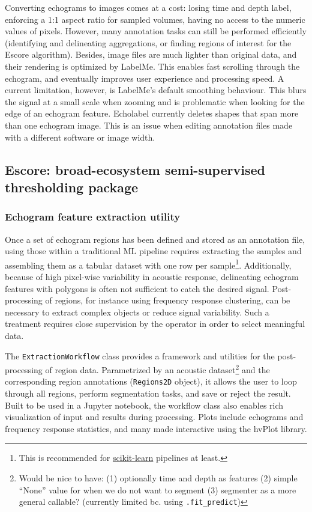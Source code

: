 \documentclass[
  10pt,
  letterpaper,
]{article}
\begin{document}
Converting echograms to images comes at a cost: losing time and depth
label, enforcing a 1:1 aspect ratio for sampled volumes, having no
access to the numeric values of pixels. However, many annotation tasks
can still be performed efficiently (identifying and delineating
aggregations, or finding regions of interest for the Escore algorithm).
Besides, image files are much lighter than original data, and their
rendering is optimized by LabelMe. This enables fast scrolling through
the echogram, and eventually improves user experience and processing
speed. A current limitation, however, is LabelMe's default smoothing
behaviour. This blurs the signal at a small scale when zooming and is
problematic when looking for the edge of an echogram feature. Echolabel
currently deletes shapes that span more than one echogram image. This is
an issue when editing annotation files made with a different software or
image width.

\subsection{Escore: broad-ecosystem semi-supervised thresholding
package}\label{escore-broad-ecosystem-semi-supervised-thresholding-package}

\subsubsection{Echogram feature extraction
utility}\label{echogram-feature-extraction-utility}

Once a set of echogram regions has been defined and stored as an
annotation file, using those within a traditional ML pipeline requires
extracting the samples and assembling them as a tabular dataset with one
row per sample\footnote{This is recommended for
  \href{https://scikit-learn.org/stable/data_interoperability.html}{scikit-learn}
  pipelines at least.}. Additionally, because of high pixel-wise
variability in acoustic response, delineating echogram features with
polygons is often not sufficient to catch the desired signal.
Post-processing of regions, for instance using frequency response
clustering, can be necessary to extract complex objects or reduce signal
variability. Such a treatment requires close supervision by the operator
in order to select meaningful data.

The \texttt{ExtractionWorkflow} class provides a framework and utilities
for the post-processing of region data. Parametrized by an acoustic
dataset\footnote{Would be nice to have: (1) optionally time and depth as
  features (2) simple ``None'' value for when we do not want to segment
  (3) segmenter as a more general callable? (currently limited bc. using
  \texttt{.fit\_predict})} and the corresponding region annotations
(\texttt{Regions2D} object), it allows the user to loop through all
regions, perform segmentation tasks, and save or reject the result.
Built to be used in a Jupyter notebook, the workflow class also enables
rich visualization of input and results during processing. Plots include
echograms and frequency response statistics, and many made interactive
using the hvPlot library.
\end{document}
